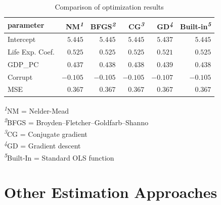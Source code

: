 \documentclass[
  letterpaper,
]{krantz}
\begin{document}
\begin{longtable}{lrrrrr}

\caption{\label{tbl-optim-compare}Comparison of optimization results}

\tabularnewline

\toprule
parameter & NM\textsuperscript{\textit{1}} & BFGS\textsuperscript{\textit{2}} & CG\textsuperscript{\textit{3}} & GD\textsuperscript{\textit{4}} & Built-in\textsuperscript{\textit{5}} \\ 
\midrule\addlinespace[2.5pt]
Intercept & \textcolor[HTML]{404040}{$5.445$} & \textcolor[HTML]{404040}{$5.445$} & \textcolor[HTML]{404040}{$5.445$} & \textcolor[HTML]{404040}{$5.437$} & \textcolor[HTML]{404040}{$5.445$} \\ 
Life Exp. Coef. & \textcolor[HTML]{404040}{$0.525$} & \textcolor[HTML]{404040}{$0.525$} & \textcolor[HTML]{404040}{$0.525$} & \textcolor[HTML]{404040}{$0.521$} & \textcolor[HTML]{404040}{$0.525$} \\ 
GDP\_PC & \textcolor[HTML]{404040}{$0.437$} & \textcolor[HTML]{404040}{$0.438$} & \textcolor[HTML]{404040}{$0.438$} & \textcolor[HTML]{404040}{$0.439$} & \textcolor[HTML]{404040}{$0.438$} \\ 
Corrupt & \textcolor[HTML]{404040}{$-0.105$} & \textcolor[HTML]{404040}{$-0.105$} & \textcolor[HTML]{404040}{$-0.105$} & \textcolor[HTML]{404040}{$-0.107$} & \textcolor[HTML]{404040}{$-0.105$} \\ 
MSE & \textcolor[HTML]{404040}{$0.367$} & \textcolor[HTML]{404040}{$0.367$} & \textcolor[HTML]{404040}{$0.367$} & \textcolor[HTML]{404040}{$0.367$} & \textcolor[HTML]{404040}{$0.367$} \\ 
\bottomrule

\end{longtable}

\begin{minipage}{\linewidth}
\textsuperscript{\textit{1}}NM = Nelder-Mead\\
\textsuperscript{\textit{2}}BFGS = Broyden–Fletcher–Goldfarb–Shanno\\
\textsuperscript{\textit{3}}CG = Conjugate gradient\\
\textsuperscript{\textit{4}}GD = Gradient descent\\
\textsuperscript{\textit{5}}Built-In = Standard OLS function\\
\end{minipage}

\section{Other Estimation Approaches}\label{sec-estim-other}
\end{document}
